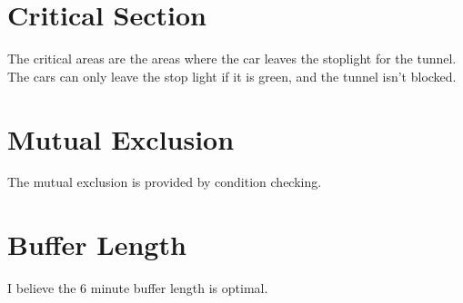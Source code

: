 \documentclass[12pt]{amsart}
\title{}
\author{}
\date{} %
\begin{document}
\section{Critical Section}
The critical areas are the areas where the car leaves the stoplight for the tunnel. The cars can only leave the stop light if it is green, and the tunnel isn't blocked.

\section{Mutual Exclusion}
The mutual exclusion is provided by condition checking.

\section{Buffer Length}
I believe the 6 minute buffer length is optimal.
\end{document}
